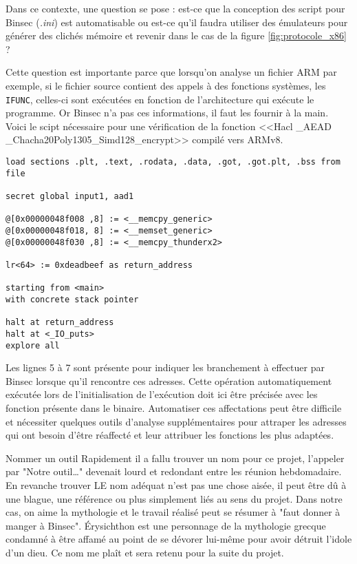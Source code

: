Dans ce contexte, une question se pose : est-ce que la conception des script pour Binsec (\textit{.ini}) est automatisable ou est-ce qu'il faudra utiliser des émulateurs pour générer des clichés mémoire et revenir dans le cas de la figure \ref{fig:protocole_x86} ?\smallbreak

Cette question est importante parce que lorsqu'on analyse un fichier ARM par exemple, si le fichier source contient des appels à des fonctions systèmes, les \texttt{IFUNC}, celles-ci sont exécutées en fonction de l'architecture qui exécute le programme. Or Binsec n'a pas ces informations, il faut les fournir à la main. Voici le scipt nécessaire pour une vérification de la fonction <<Hacl \_AEAD \_Chacha20Poly1305\_Simd128\_encrypt>> compilé vers ARMv8.

\begin{listing}[!ht]
    \caption{Script d'instruction pour analyser un binaire compilé vers ARM}
    \label{lst:script_arm_exemple}
    \begin{verbatim}
load sections .plt, .text, .rodata, .data, .got, .got.plt, .bss from file

secret global input1, aad1

@[0x00000048f008 ,8] := <__memcpy_generic>
@[0x00000048f018, 8] := <__memset_generic>
@[0x00000048f030 ,8] := <__memcpy_thunderx2>

lr<64> := 0xdeadbeef as return_address

starting from <main>
with concrete stack pointer

halt at return_address
halt at <_IO_puts>
explore all 
    \end{verbatim}
\end{listing}

Les lignes 5 à 7 sont présente pour indiquer les branchement à effectuer par Binsec lorsque qu'il rencontre ces adresses. Cette opération automatiquement exécutée lors de l'initialisation de l'exécution doit ici être précisée avec les fonction présente dans le binaire. Automatiser ces affectations peut être difficile et nécessiter quelques outils d'analyse supplémentaires pour attraper les adresses qui ont besoin d'être réaffecté et leur attribuer les fonctions les plus adaptées.\medbreak


\begin{CitationBox}{Nommer un outil}
    Rapidement il a fallu trouver un nom pour ce projet, l'appeler par "Notre outil\dots" devenait lourd et redondant entre les réunion hebdomadaire. En revanche trouver LE nom adéquat n'est pas une chose aisée, il peut être dû à une blague, une référence ou plus simplement liés au sens du projet. Dans notre cas, on aime la mythologie et le travail réalisé peut se résumer à "faut donner à manger à Binsec".\smallbreak
    Érysichthon est une personnage de la mythologie grecque condamné à être affamé au point de se dévorer lui-même pour avoir détruit l'idole d'un dieu. Ce nom me plaît et sera retenu pour la suite du projet. 
\end{CitationBox}

